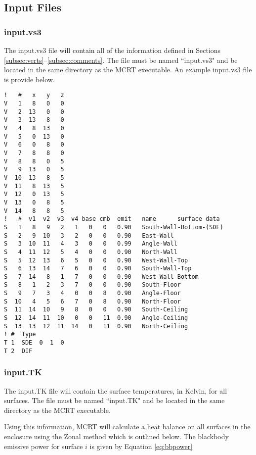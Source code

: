 \documentclass{article}
\begin{document}
\subsection{Input Files}

\subsubsection{input.vs3}

The input.vs3 file will contain all of the information defined in Sections \ref{subsec:verts}--\ref{subsec:comments}. The file must be named ``input.vs3" and be located in the same directory as the MCRT executable. An example input.vs3 file is provide below.

\begin{lstlisting}
!   #   x   y   z
V   1   8   0   0
V   2  13   0   0
V   3  13   8   0
V   4   8  13   0
V   5   0  13   0
V   6   0   8   0
V   7   8   8   0
V   8   8   0   5
V   9  13   0   5
V  10  13   8   5
V  11   8  13   5
V  12   0  13   5
V  13   0   8   5
V  14   8   8   5
!   #  v1  v2  v3  v4 base cmb  emit   name      surface data
S   1   8   9   2   1   0   0   0.90   South-Wall-Bottom-(SDE)
S   2   9  10   3   2   0   0   0.90   East-Wall
S   3  10  11   4   3   0   0   0.99   Angle-Wall
S   4  11  12   5   4   0   0   0.90   North-Wall
S   5  12  13   6   5   0   0   0.90   West-Wall-Top
S   6  13  14   7   6   0   0   0.90   South-Wall-Top
S   7  14   8   1   7   0   0   0.90   West-Wall-Bottom
S   8   1   2   3   7   0   0   0.90   South-Floor
S   9   7   3   4   0   0   8   0.90   Angle-Floor
S  10   4   5   6   7   0   8   0.90   North-Floor
S  11  14  10   9   8   0   0   0.90   South-Ceiling
S  12  14  11  10   0   0   11  0.90   Angle-Ceiling
S  13  13  12  11  14   0   11  0.90   North-Ceiling
! #  Type
T 1  SDE  0  1  0
T 2  DIF
\end{lstlisting}

\subsubsection{input.TK}

The input.TK file will contain the surface temperatures, in Kelvin, for all surfaces. The file must be named ``input.TK" and be located in the same directory as the MCRT executable.

Using this information, MCRT will calculate a heat balance on all surfaces in the enclosure using the Zonal method which is outlined below. The blackbody emissive power for surface $i$ is given by Equation \ref{eq:bbpower}
\end{document}
